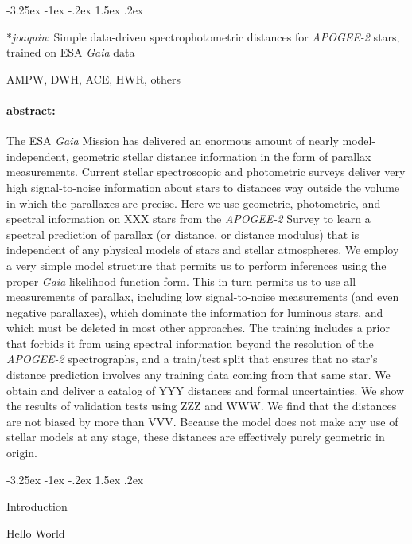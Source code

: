 \documentclass[12pt]{article}
\makeatletter
\renewcommand\section{\@startsection {section}{1}{\z@}%
  {-3.25ex \@plus -1ex \@minus -.2ex}%
  {1.5ex \@plus .2ex}%
  {\raggedright\normalfont\large\bfseries}}
\newcommand{\acronym}[1]{{\small{#1}}}
\newcommand{\project}[1]{\textsl{#1}}
\newcommand{\joaquin}{\project{joaquin}}
\newcommand{\ESA}{\acronym{ESA}}
\newcommand{\Gaia}{\project{Gaia}}
\newcommand{\APOGEE}{\project{\acronym{APOGEE-2}}}
\makeatother
\begin{document}
\thispagestyle{empty}

\section*{\joaquin{}: Simple data-driven spectrophotometric distances for \APOGEE{} stars, trained on \ESA{} \Gaia{} data}

\noindent
AMPW, DWH, ACE, HWR, others

\paragraph{abstract:}
The \ESA{} \Gaia{} Mission has delivered an enormous amount of nearly
model-independent, geometric stellar distance information in the form
of parallax measurements.
Current stellar spectroscopic and photometric surveys deliver very
high signal-to-noise information about stars to distances way outside
the volume in which the parallaxes are precise.
Here we use geometric, photometric, and spectral information on XXX
stars from the \APOGEE{} Survey to learn a spectral prediction of
parallax (or distance, or distance modulus) that is independent of
any physical models of stars and stellar atmospheres.
We employ a very simple model structure that permits us to perform
inferences using the proper \Gaia{} likelihood function form.
This in turn permits us to use all measurements of parallax, including
low signal-to-noise measurements (and even negative parallaxes), which
dominate the information for luminous stars, and which must be deleted
in most other approaches.
The training includes a prior that forbids it from using spectral
information beyond the resolution of the \APOGEE{} spectrographs,
and a train/test split that ensures that no star's distance prediction
involves any training data coming from that same star.
We obtain and deliver a catalog of YYY distances and formal uncertainties.
We show the results of validation tests using ZZZ and WWW.
We find that the distances are not biased by more than VVV.
Because the model does not make any use of stellar models at any
stage, these distances are effectively purely geometric in origin.

\section{Introduction}

Hello World
\end{document}
